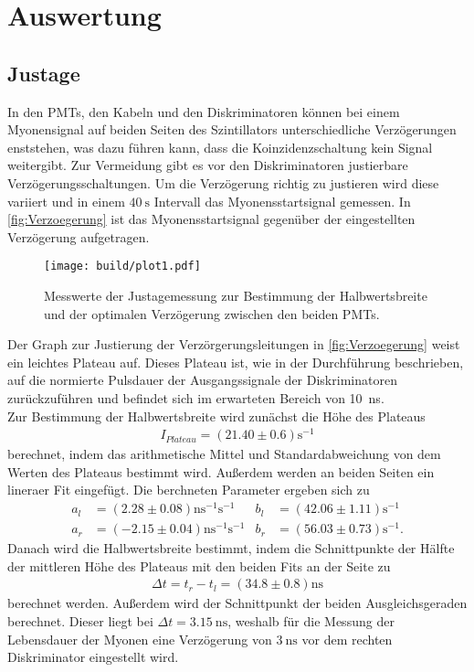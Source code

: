 \section{Auswertung}
\label{sec:Auswertung}

\subsection{Justage}
\label{subsec:Justage}
In den PMTs, den Kabeln und den  Diskriminatoren können bei einem Myonensignal auf beiden Seiten des Szintillators unterschiedliche Verzögerungen
enststehen, was dazu führen kann, dass die Koinzidenzschaltung kein Signal weitergibt.
Zur Vermeidung gibt es vor den Diskriminatoren justierbare Verzögerungsschaltungen. Um die Verzögerung richtig zu justieren wird diese variiert und in einem $\qty{40}{\second}$ Intervall
das Myonensstartsignal gemessen. In \autoref{fig:Verzoegerung} ist das Myonensstartsignal gegenüber der eingestellten Verzögerung aufgetragen.
\begin{figure}[H]
  \centering
  \texttt{[image: build/plot1.pdf]}
  \caption {Messwerte der Justagemessung zur Bestimmung der Halbwertsbreite und der optimalen Verzögerung zwischen den beiden PMTs.}
  \label{fig:Verzoegerung}
\end{figure}
Der Graph zur Justierung der Verzörgerungsleitungen in \autoref{fig:Verzoegerung} weist ein leichtes Plateau auf.
Dieses Plateau ist, wie in der Durchführung beschrieben, auf die normierte Pulsdauer der Ausgangssignale der Diskriminatoren zurückzuführen und befindet sich im erwarteten Bereich von \SI{10}{\nano \second}. \\
Zur Bestimmung der Halbwertsbreite wird zunächst die Höhe des Plateaus
\begin{align*}
    I_{Plateau} = (21.40 \pm 0.6) \si{\second^{-1}}
\end{align*}
berechnet, indem das arithmetische Mittel und Standardabweichung von dem Werten des Plateaus bestimmt wird.
Außerdem werden an beiden Seiten ein lineraer Fit eingefügt.
Die berchneten Parameter ergeben sich zu 
\begin{align}
  a_l &= (2.28 \pm 0.08)  \si{\nano\second^{-1}\second^{-1}} & b_l &= (42.06 \pm 1.11) \si{\second^{-1}} \\
  a_r &= (-2.15 \pm 0.04) \si{\nano\second^{-1}\second^{-1}} & b_r &= (56.03 \pm 0.73) \si{\second^{-1}}.
\end{align}
Danach wird die Halbwertsbreite bestimmt, indem die Schnittpunkte der Hälfte der mittleren Höhe des Plateaus mit den beiden Fits an der Seite zu
\begin{align*}
   \Delta t = t_r - t_l = (34.8 \pm 0.8) \si{\nano\second}
\end{align*}
berechnet werden.
Außerdem wird der Schnittpunkt der beiden Ausgleichsgeraden berechnet.
Dieser liegt bei $\Delta t = \qty{3.15}{\nano\second}$, weshalb für die Messung der Lebensdauer der Myonen eine Verzögerung von $\qty{3}{\nano\second}$
vor dem rechten Diskriminator eingestellt wird.


